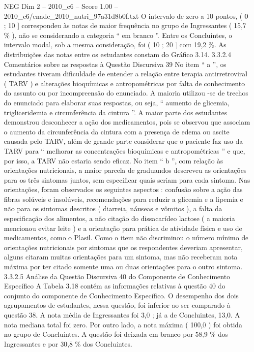 \begin{textsample}{NEG Dim 2 – 2010\_c6 – Score 1.00 – 2010\_c6/enade\_2010\_nutri\_97a31d8b0f.txt}
O intervalo de zero a 10 pontos, ( 0 ; 10 ] correspondeu às notas de maior frequência no grupo de Ingressantes ( 15,7 \% ), não se considerando a categoria “ em branco ”.
Entre os Concluintes, o intervalo modal, sob a mesma consideração, foi ( 10 ; 20 ] com 19,2 \%.
As distribuições das notas entre os estudantes constam do Gráfico 3.14. 3.3.2.4 Comentários sobre as respostas à Questão Discursiva 39 No item “ a ”, os estudantes tiveram dificuldade de entender a relação entre terapia antirretroviral ( TARV ) e alterações bioquímicas e antropométricas por falta de conhecimento do assunto ou por incompreensão do enunciado.
A maioria utilizou -se de trechos do enunciado para elaborar suas respostas, ou seja, “ aumento de glicemia, trigliceridemia e circunferência da cintura ”.
A maior parte dos estudantes demonstrou desconhecer a ação dos medicamentos, pois se observou que associam o aumento da circunferência da cintura com a presença de edema ou ascite causada pelo TARV, além de grande parte considerar que o paciente faz uso da TARV para “ melhorar as concentrações bioquímicas e antropométricas ” e que, por isso, a TARV não estaria sendo eficaz.
No item “ b ”, com relação às orientações nutricionais, a maior parcela de graduandos descreveu as orientações para os três sintomas juntos, sem especificar quais seriam para cada sintoma.
Nas orientações, foram observados os seguintes aspectos : confusão sobre a ação das fibras solúveis e insolúveis, recomendações para reduzir a glicemia e a lipemia e não para os sintomas descritos ( diarreia, náuseas e vômitos ), a falta da especificação dos alimentos, a não citação do dissacarídeo lactose ( a maioria mencionou evitar leite ) e a orientação para prática de atividade física e uso de medicamentos, como o Plasil.
Como o item não discriminou o número mínimo de orientações nutricionais por sintomas que os respondentes deveriam apresentar, alguns citaram muitas orientações para um sintoma, mas não receberam nota máxima por ter citado somente uma ou duas orientações para o outro sintoma. 3.3.2.5 Análise da Questão Discursiva 40 do Componente de Conhecimento Específico A Tabela 3.18 contém as informações relativas à questão 40 do conjunto do componente de Conhecimento Específico.
O desempenho dos dois agrupamentos de estudantes, nessa questão, foi inferior ao ser comparado à questão 38.
A nota média de Ingressantes foi 3,0 ; já a de Concluintes, 13,0.
A nota mediana total foi zero.
Por outro lado, a nota máxima ( 100,0 ) foi obtida no grupo de Concluintes.
A questão foi deixada em branco por 58,9 \% dos Ingressantes e por 30,8 \% dos Concluintes.

\end{textsample}
